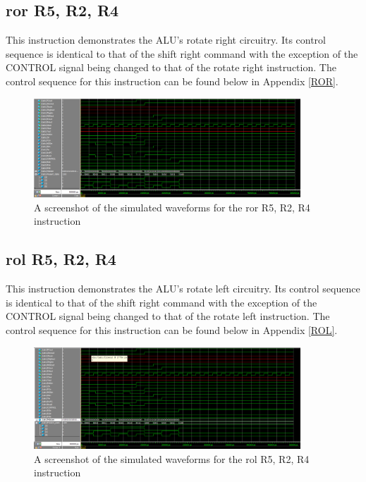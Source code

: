 \documentclass{article}
\begin{document}
    \subsection{ror R5, R2, R4}
    This instruction demonstrates the ALU's rotate right circuitry. Its control sequence is identical to that of the shift right command with the exception of the CONTROL signal being changed to that of the rotate right instruction. The control sequence for this instruction can be found below in Appendix \ref{ROR}.

    \begin{figure}[h!]
        \begin{center}
            \includegraphics[width=10cm]{ror}
            \caption{A screenshot of the simulated waveforms for the ror R5, R2, R4 instruction}
        \end{center}
    \end{figure}

    \subsection{rol R5, R2, R4}
    This instruction demonstrates the ALU's rotate left circuitry. Its control sequence is identical to that of the shift right command with the exception of the CONTROL signal being changed to that of the rotate left instruction. The control sequence for this instruction can be found below in Appendix \ref{ROL}.

    \begin{figure}[h!]
        \begin{center}
            \includegraphics[width=10cm]{rol}
            \caption{A screenshot of the simulated waveforms for the rol R5, R2, R4 instruction}
        \end{center}
    \end{figure}
\end{document}
